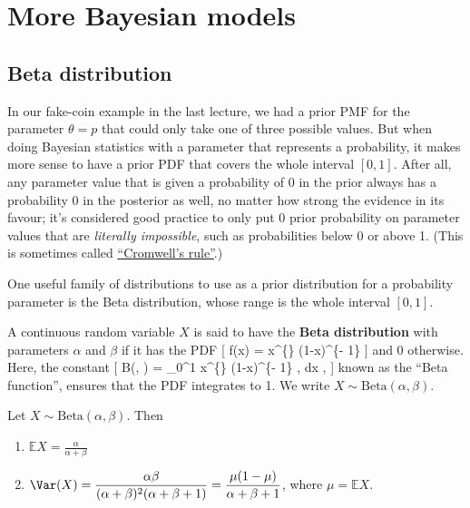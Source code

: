 \documentclass[
  letterpaper,
]{report}
\providecommand{\tightlist}{%
  \setlength{\itemsep}{0pt}\setlength{\parskip}{0pt}}\usepackage{longtable,booktabs,array}
\theoremstyle{definition}
\theoremstyle{definition}
\theoremstyle{remark}
\begin{document}
\hypertarget{L20-bayes-models}{%
\chapter{More Bayesian models}\label{L20-bayes-models}}

\hypertarget{beta}{%
\section{Beta distribution}\label{beta}}

In our fake-coin example in the last lecture, we had a prior PMF for the
parameter \(\theta = p\) that could only take one of three possible
values. But when doing Bayesian statistics with a parameter that
represents a probability, it makes more sense to have a prior PDF that
covers the whole interval \([0,1]\). After all, any parameter value that
is given a probability of 0 in the prior always has a probability 0 in
the posterior as well, no matter how strong the evidence in its favour;
it's considered good practice to only put 0 prior probability on
parameter values that are \emph{literally impossible}, such as
probabilities below 0 or above 1. (This is sometimes called
\href{https://en.wikipedia.org/wiki/Cromwell\%27s_rule}{``Cromwell's
rule''}.)

One useful family of distributions to use as a prior distribution for a
probability parameter is the Beta distribution, whose range is the whole
interval \([0,1]\).

A continuous random variable \(X\) is said to have the \textbf{Beta
distribution} with parameters \(\alpha\) and \(\beta\) if it has the PDF
{[} f(x) =  x\^{}\{\}
(1-x)\^{}\{\beta - 1\} \qquad {} {]} and 0
otherwise. Here, the constant {[} B(\alpha, \beta) = \int\_0\^{}1
x\^{}\{\} (1-x)\^{}\{\beta - 1\} , \mathrm dx , {]} known as the
``Beta function'', ensures that the PDF integrates to 1. We write
\(X \sim \text{Beta}(\alpha, \beta)\).

Let \(X \sim \text{Beta}(\alpha,\beta)\). Then

\begin{enumerate}
\def\labelenumi{\arabic{enumi}.}
\tightlist
\item
  \(\mathbb EX = \displaystyle\frac{\alpha}{\alpha + \beta}\)
\item
  \(\Var(X) = \displaystyle\frac{\alpha\beta}{(\alpha+\beta)^2(\alpha+\beta+1)} = \displaystyle\frac{\mu(1-\mu)}{\alpha+\beta + 1}\),
  where \(\mu = \mathbb EX\).
\end{enumerate}
\end{document}
